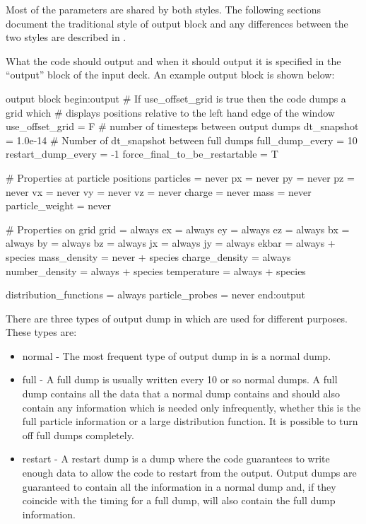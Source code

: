 Most of the parameters are shared by both styles. The following sections
document the traditional style of output block and any differences between
the two styles are described in .

What the code should output and when it should output it is
specified in the ``output'' block of the input deck.
An example output block is shown below:
\begin{lboxverbatim}{output block}
begin:output
   # If use_offset_grid is true then the code dumps a grid which
   # displays positions relative to the left hand edge of the window
   use_offset_grid = F
   # number of timesteps between output dumps
   dt_snapshot = 1.0e-14
   # Number of dt_snapshot between full dumps
   full_dump_every = 10
   restart_dump_every = -1
   force_final_to_be_restartable = T

   # Properties at particle positions
   particles = never
   px = never
   py = never
   pz = never
   vx = never
   vy = never
   vz = never
   charge = never
   mass = never
   particle_weight = never

   # Properties on grid
   grid = always
   ex = always
   ey = always
   ez = always
   bx = always
   by = always
   bz = always
   jx = always
   jy = always
   ekbar = always + species
   mass_density = never + species
   charge_density = always
   number_density = always + species
   temperature = always + species

   distribution_functions = always
   particle_probes = never
end:output
\end{lboxverbatim}

There are three types of output dump in {\EPOCH} which are used for different
purposes. These types are:

\begin{itemize}
\item normal - The most frequent type of output dump in {\EPOCH} is a
  normal dump.
\item full - A full dump is usually written every 10 or so normal dumps. A
  full dump contains all the data that a normal dump contains and should also
  contain any information which is needed only infrequently, whether this is
  the full particle information or a large distribution function. It is
  possible to turn off full dumps completely.
\item restart - A restart dump is a dump where the code guarantees to
  write enough data to allow the code to restart from the output. Output dumps
  are guaranteed to contain all the information in a normal dump and, if they
  coincide with the timing for a full dump, will also contain the full dump
  information.
\end{itemize}

